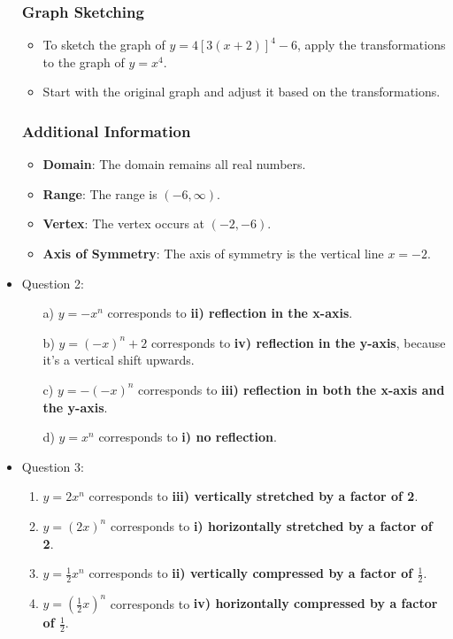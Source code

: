 \documentclass{article}
\begin{document}
\begin{itemize}
\subsubsection*{Graph Sketching}
\begin{itemize}
    \item To sketch the graph of \(y = 4[3(x + 2)]^4 - 6\), apply the transformations to the graph of \(y = x^4\).
    \item Start with the original graph and adjust it based on the transformations.
\end{itemize}

\subsubsection*{Additional Information}
\begin{itemize}
    \item \textbf{Domain}: The domain remains all real numbers.
    \item \textbf{Range}: The range is \((-6, \infty)\).
    \item \textbf{Vertex}: The vertex occurs at \((-2, -6)\).
    \item \textbf{Axis of Symmetry}: The axis of symmetry is the vertical line \(x = -2\).
\end{itemize}
\item Question 2:
\begin{enumerate}
    \item[a)] \(y = -x^n\) corresponds to \textbf{ii) reflection in the x-axis}.
    \item[b)] \(y = (-x)^n + 2\) corresponds to \textbf{iv) reflection in the y-axis}, because it's a vertical shift upwards.
    \item[c)] \(y = -(-x)^n\) corresponds to \textbf{iii) reflection in both the x-axis and the y-axis}.
    \item[d)] \(y = x^n\) corresponds to \textbf{i) no reflection}.
\end{enumerate}

\item Question 3:
\begin{enumerate}
    \item \(y = 2x^n\) corresponds to \textbf{iii) vertically stretched by a factor of 2}.
    \item \(y = (2x)^n\) corresponds to \textbf{i) horizontally stretched by a factor of 2}.
    \item \(y = \frac{1}{2}x^n\) corresponds to \textbf{ii) vertically compressed by a factor of \(\frac{1}{2}\)}.
    \item \(y = \left(\frac{1}{2}x\right)^n\) corresponds to \textbf{iv) horizontally compressed by a factor of \(\frac{1}{2}\)}.
\end{enumerate}


\end{itemize}
\end{document}
